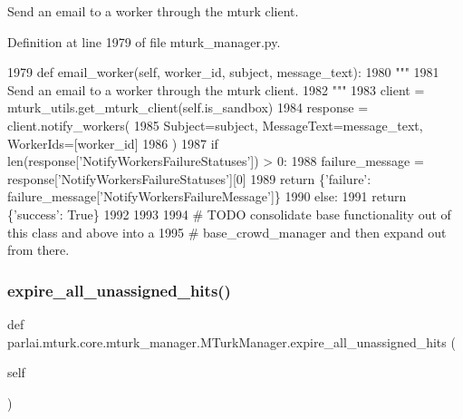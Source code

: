 \begin{DoxyVerb}Send an email to a worker through the mturk client.
\end{DoxyVerb}
 

Definition at line 1979 of file mturk\+\_\+manager.\+py.


\begin{DoxyCode}
1979     \textcolor{keyword}{def }email\_worker(self, worker\_id, subject, message\_text):
1980         \textcolor{stringliteral}{"""}
1981 \textcolor{stringliteral}{        Send an email to a worker through the mturk client.}
1982 \textcolor{stringliteral}{        """}
1983         client = mturk\_utils.get\_mturk\_client(self.is\_sandbox)
1984         response = client.notify\_workers(
1985             Subject=subject, MessageText=message\_text, WorkerIds=[worker\_id]
1986         )
1987         \textcolor{keywordflow}{if} len(response[\textcolor{stringliteral}{'NotifyWorkersFailureStatuses'}]) > 0:
1988             failure\_message = response[\textcolor{stringliteral}{'NotifyWorkersFailureStatuses'}][0]
1989             \textcolor{keywordflow}{return} \{\textcolor{stringliteral}{'failure'}: failure\_message[\textcolor{stringliteral}{'NotifyWorkersFailureMessage'}]\}
1990         \textcolor{keywordflow}{else}:
1991             \textcolor{keywordflow}{return} \{\textcolor{stringliteral}{'success'}: \textcolor{keyword}{True}\}
1992 
1993 
1994 \textcolor{comment}{# TODO consolidate base functionality out of this class and above into a}
1995 \textcolor{comment}{# base\_crowd\_manager and then expand out from there.}
\end{DoxyCode}
\mbox{\label{classparlai_1_1mturk_1_1core_1_1mturk__manager_1_1MTurkManager_a063250ea0ea08fe75ab3bb5aee637138}} 
\subsubsection{\texorpdfstring{expire\+\_\+all\+\_\+unassigned\+\_\+hits()}{expire\_all\_unassigned\_hits()}}
{\footnotesize\ttfamily def parlai.\+mturk.\+core.\+mturk\+\_\+manager.\+M\+Turk\+Manager.\+expire\+\_\+all\+\_\+unassigned\+\_\+hits (\begin{DoxyParamCaption}\item[{}]{self }\end{DoxyParamCaption})}

